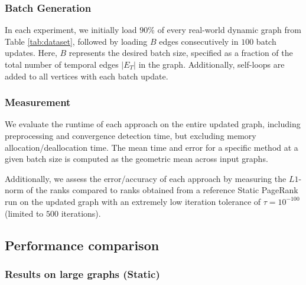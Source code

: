 


\subsubsection{Batch Generation}
\label{sec:batch-generation}

In each experiment, we initially load $90\%$ of every real-world dynamic graph from Table \ref{tab:dataset}, followed by loading $B$ edges consecutively in $100$ batch updates. Here, $B$ represents the desired batch size, specified as a fraction of the total number of temporal edges $|E_T|$ in the graph. Additionally, self-loops are added to all vertices with each batch update.


\subsubsection{Measurement}
\label{sec:measurement}

We evaluate the runtime of each approach on the entire updated graph, including preprocessing and convergence detection time, but excluding memory allocation/deallocation time. The mean time and error for a specific method at a given batch size is computed as the geometric mean across input graphs. Additionally, we assess the error/accuracy of each approach by measuring the $L1$-norm \cite{ohsaka2015efficient} of the ranks compared to ranks obtained from a reference Static PageRank run on the updated graph with an extremely low iteration tolerance of $\tau = 10^{-100}$ (limited to $500$ iterations).




\subsection{Performance comparison}

\subsubsection{Results on large graphs (Static)}
\label{sec:static-comparison}

